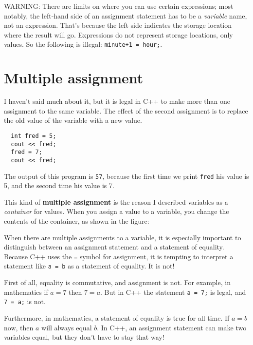WARNING: There are limits on where you can use certain
expressions; most notably, the left-hand side of an assignment
statement has to be a {\em variable} name, not an expression.
That's because the left side indicates the storage location
where the result will go.  Expressions
do not represent storage locations, only values.  So the
following is illegal:  {\tt minute+1 = hour;}.

\section{Multiple assignment}

I haven't said much about it, but it is legal in C++ to
make more than one assignment to the same variable.  The
effect of the second assignment is to replace the old value
of the variable with a new value.

\begin{verbatim}
  int fred = 5;
  cout << fred;
  fred = 7;
  cout << fred;
\end{verbatim}
%
The output of this program is {\tt 57}, because the first
time we print {\tt fred} his value is 5, and the second time
his value is 7.

This kind of {\bf multiple assignment} is the reason I
described variables as a {\em container} for values.  When
you assign a value to a variable, you change the contents of
the container, as shown in the figure:

\vspace{0.1in}
\centerline{}
\vspace{0.1in}

When there are multiple assignments to a variable, it is especially
important to distinguish between an assignment statement and a
statement of equality.  Because C++ uses the {\tt =} symbol for
assignment, it is tempting to interpret a statement like {\tt a = b}
as a statement of equality.  It is not!

First of all, equality is commutative, and assignment is not.
For example, in mathematics if $a = 7$ then $7 = a$.  But in
C++ the statement {\tt a = 7;} is legal, and {\tt 7 = a;}
is not.

Furthermore, in mathematics, a statement of equality is true
for all time.  If $a = b$ now, then $a$ will always equal $b$.
In C++, an assignment statement can make two variables equal,
but they don't have to stay that way!

